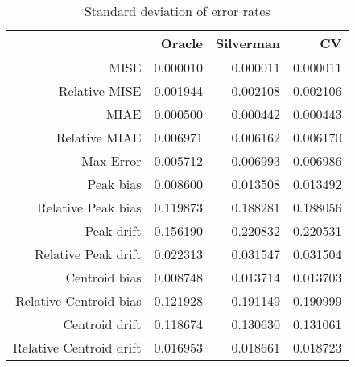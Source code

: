 \begin{table}[ht]
\centering
\begin{tabular}{rrrr}
  \hline
 & Oracle & Silverman & CV \\ 
  \hline
MISE & 0.000010 & 0.000011 & 0.000011 \\ 
  Relative MISE & 0.001944 & 0.002108 & 0.002106 \\ 
  MIAE & 0.000500 & 0.000442 & 0.000443 \\ 
  Relative MIAE & 0.006971 & 0.006162 & 0.006170 \\ 
  Max Error & 0.005712 & 0.006993 & 0.006986 \\ 
  Peak bias & 0.008600 & 0.013508 & 0.013492 \\ 
  Relative Peak bias & 0.119873 & 0.188281 & 0.188056 \\ 
  Peak drift & 0.156190 & 0.220832 & 0.220531 \\ 
  Relative Peak drift & 0.022313 & 0.031547 & 0.031504 \\ 
  Centroid bias & 0.008748 & 0.013714 & 0.013703 \\ 
  Relative Centroid bias & 0.121928 & 0.191149 & 0.190999 \\ 
  Centroid drift & 0.118674 & 0.130630 & 0.131061 \\ 
  Relative Centroid drift & 0.016953 & 0.018661 & 0.018723 \\ 
   \hline
\end{tabular}
\caption{Standard deviation of error rates} 
\label{tbl:stddev_error_rates}
\end{table}
